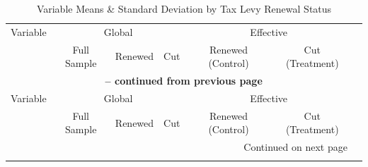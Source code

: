 \begin{longtable}{p{4cm}cccccc}
    \caption{Variable Means \& Standard Deviation by Tax Levy Renewal Status} \label{tab:variable_means_sd} \\
    \hline
    Variable & \multicolumn{3}{c}{Global} & \multicolumn{2}{c}{Effective} \\
    \cmidrule(lr){2-4} \cmidrule(lr){5-6}
    & Full Sample & Renewed & Cut & Renewed (Control) & Cut (Treatment) \\
    \hline
    \endfirsthead

    \multicolumn{6}{c}{{\bfseries \tablename\ \thetable{} -- continued from previous page}} \\
    \hline
    Variable & \multicolumn{3}{c}{Global} & \multicolumn{2}{c}{Effective} \\
    \cmidrule(lr){2-4} \cmidrule(lr){5-6}
    & Full Sample & Renewed & Cut & Renewed (Control) & Cut (Treatment) \\
    \hline
    \endhead

    \hline \multicolumn{6}{r}{{Continued on next page}} \\
    \endfoot

    \hline
    \endlastfoot


\end{longtable}
